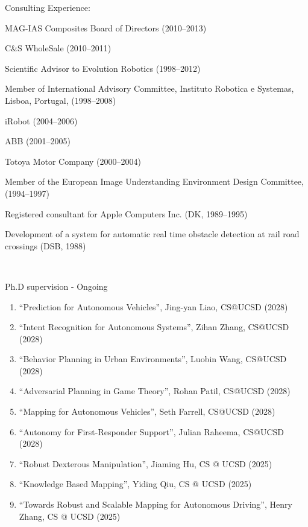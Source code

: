 \documentclass{article}
\newenvironment{sublist}{%
  \begin{list}{}{%
      \setlength{\itemsep}{0em}\setlength{\parsep}{0em}%
      \setlength{\topsep}{0em}\setlength{\parskip}{0em}%
    }%
}%
{ \end{list} }
\begin{document}
\begin{cv}
\begin{cvlist}{Consulting Experience:}
\begin{sublist}
			\item MAG-IAS Composites Board of Directors (2010--2013)
			\item C\&S WholeSale (2010--2011)
			\item Scientific Advisor to Evolution Robotics (1998--2012)
			\item Member of International Advisory Committee, Instituto Robotica e
			Systemas, Lisboa, Portugal, (1998--2008)
			\item iRobot (2004--2006)
			\item ABB (2001--2005)
			\item Totoya Motor Company (2000--2004)
			\item Member of the European Image Understanding Environment Design
			Committee, (1994--1997)
			\item Registered consultant for Apple Computers Inc. (DK, 1989--1995)
			\item Development of a system for automatic real time obstacle
			detection at rail road crossings (DSB, 1988)
		\end{sublist}
	\end{cvlist}



	\begin{cvlist}{~}

		\item[Ph.D supervision - Ongoing]\ \\
		\begin{enumerate}
			\item ``Prediction for Autonomous Vehicles'', Jing-yan Liao, CS@UCSD (2028)
			\item ``Intent Recognition for Autonomous Systems'', Zihan Zhang, CS@UCSD (2028)
			\item ``Behavior Planning in Urban Environments'', Luobin Wang, CS@UCSD (2028)
			\item ``Adversarial Planning in Game Theory'', Rohan Patil, CS@UCSD (2028)
			\item ``Mapping for Autonomous Vehicles'', Seth Farrell, CS@UCSD (2028)
			\item ``Autonomy for First-Responder Support'', Julian Raheema, CS@UCSD (2028)
			\item ``Robust Dexterous Manipulation'', Jiaming Hu, CS @ UCSD (2025)
			\item ``Knowledge Based Mapping'', Yiding Qiu, CS @ UCSD (2025)
			\item ``Towards Robust and Scalable Mapping for Autonomous Driving'', Henry Zhang, CS @  UCSD (2025)
		\end{enumerate}


\end{cvlist}
\end{cv}
\end{document}
